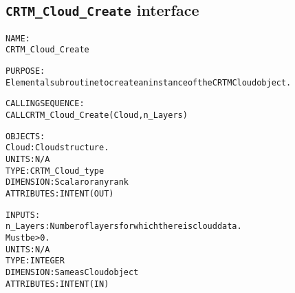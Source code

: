 \subsection{\texttt{CRTM\_Cloud\_Create} interface}
  \label{sec:CRTM_Cloud_Create_interface}
  \begin{alltt}
 
  NAME:
        CRTM_Cloud_Create
 
  PURPOSE:
        Elemental subroutine to create an instance of the CRTM Cloud object.
 
  CALLING SEQUENCE:
        CALL CRTM_Cloud_Create( Cloud, n_Layers )
 
  OBJECTS:
        Cloud:        Cloud structure.
                      UNITS:      N/A
                      TYPE:       CRTM_Cloud_type
                      DIMENSION:  Scalar or any rank
                      ATTRIBUTES: INTENT(OUT)
 
  INPUTS:
        n_Layers:     Number of layers for which there is cloud data.
                      Must be > 0.
                      UNITS:      N/A
                      TYPE:       INTEGER
                      DIMENSION:  Same as Cloud object
                      ATTRIBUTES: INTENT(IN)
 
  \end{alltt}
